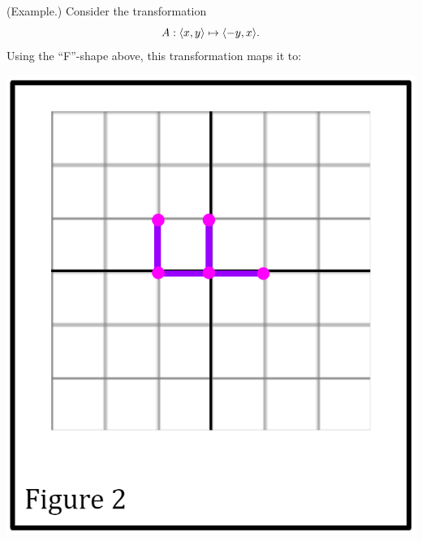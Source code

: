\documentclass[letterpaper]{article}
\begin{document}
\begin{mdframed}[]
    (Example.) Consider the transformation 
    \[A: \langle x, y \rangle \mapsto \langle -y, x \rangle.\]
    Using the ``F''-shape above, this transformation maps it to: 
    \begin{center}
        \includegraphics[scale=0.3]{../assets/f1.png}
    \end{center}
\end{mdframed}
\end{document}
